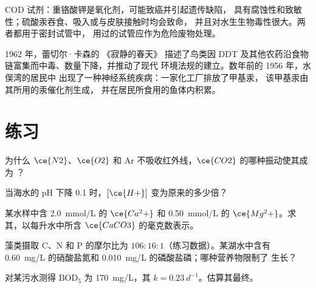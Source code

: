 \begin{safety}{}
COD 试剂：重铬酸钾是氧化剂，可能致癌并引起遗传缺陷，
具有腐蚀性和致敏性；硫酸汞吞食、吸入或与皮肤接触时均会致命，
并且对水生生物毒性很大。两者都用于密封试管中，
用过的试管应作为危险废物处理。
\end{safety}

\begin{history}[一本书与一个海湾]
1962 年，蕾切尔·卡森的 《寂静的春天》 描述了鸟类因
DDT 及其他农药沿食物链富集而中毒、数量下降，并推动了现代
环境法规的建立。数年前的 1956 年，水俣湾的居民中
出现了一种神经系统疾病：一家化工厂排放了甲基汞，
该甲基汞由其所用的汞催化剂生成，
并在居民所食用的鱼体内积累。
\end{history}

\section{练习}

\begin{exercise}[$\star$]\label{exo:b3:environmental-toxicology:1}
为什么 $\ce{N2}$、$\ce{O2}$ 和 Ar 不吸收红外线，$\ce{CO2}$ 的哪种振动使其成为
？
\end{exercise}

\begin{exercise}[$\star$]\label{exo:b3:environmental-toxicology:2}
当海水的 pH 下降 0.1 时，$[\ce{H+}]$ 变为原来的多少倍？
\end{exercise}

\begin{exercise}[$\star$]\label{exo:b3:environmental-toxicology:3}
某水样中含 \qty{2.0}{mmol/L} 的 $\ce{Ca^2+}$ 和 \qty{0.50}{mmol/L} 的 $\ce{Mg^2+}$。求其，以每升水中所含 $\ce{CaCO3}$ 的毫克数表示。
\end{exercise}

\begin{exercise}[$\star$]\label{exo:b3:environmental-toxicology:4}
藻类摄取 C、N 和 P 的摩尔比为 $106 : 16 : 1$（练习数据）。某湖水中含有
\qty{0.60}{mg/L} 的硝酸盐氮和 \qty{0.010}{mg/L} 的磷酸盐磷；哪种营养物限制了
生长？
\end{exercise}

\begin{exercise}[$\star\star$]\label{exo:b3:environmental-toxicology:5}
对某污水测得 $\mathrm{BOD_5}$ 为 \qty{170}{mg/L}，其 $k = \qty{0.23}{d^{-1}}$。估算其最终。
\end{exercise}

